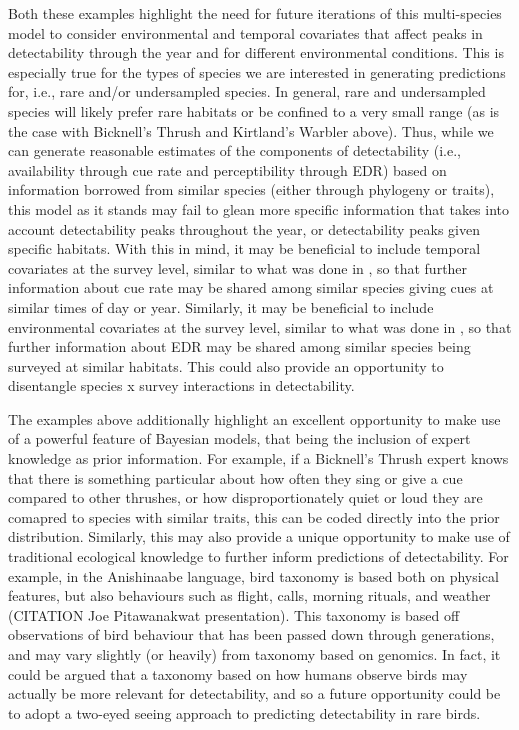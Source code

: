 \documentclass[12pt]{article}
\begin{document}
Both these examples highlight the need for future iterations of this multi-species model to consider environmental and temporal covariates that affect peaks in detectability through the year and for different environmental conditions.
This is especially true for the types of species we are interested in generating predictions for, i.e., rare and/or undersampled species.
In general, rare and undersampled species will likely prefer rare habitats or be confined to a very small range (as is the case with Bicknell's Thrush and Kirtland's Warbler above).
Thus, while we can generate reasonable estimates of the components of detectability (i.e., availability through cue rate and perceptibility through EDR) based on information borrowed from similar species (either through phylogeny or traits), this model as it stands may fail to glean more specific information that takes into account detectability peaks throughout the year, or detectability peaks given specific habitats.
With this in mind, it may be beneficial to include temporal covariates at the survey level, similar to what was done in \citet{solymos_calibrating_2013, solymos_evaluating_2018, edwards_point_2023}, so that further information about cue rate may be shared among similar species giving cues at similar times of day or year.
Similarly, it may be beneficial to include environmental covariates at the survey level, similar to what was done in \citet{solymos_calibrating_2013, edwards_point_2023}, so that further information about EDR may be shared among similar species being surveyed at similar habitats.
This could also provide an opportunity to disentangle species x survey interactions in detectability.

\par The examples above additionally highlight an excellent opportunity to make use of a powerful feature of Bayesian models, that being the inclusion of expert knowledge as prior information.
For example, if a Bicknell's Thrush expert knows that there is something particular about how often they sing or give a cue compared to other thrushes, or how disproportionately quiet or loud they are comapred to species with similar traits, this can be coded directly into the prior distribution.
Similarly, this may also provide a unique opportunity to make use of traditional ecological knowledge to further inform predictions of detectability.
For example, in the Anishinaabe language, bird taxonomy is based both on physical features, but also behaviours such as flight, calls, morning rituals, and weather (CITATION Joe Pitawanakwat presentation).
This taxonomy is based off observations of bird behaviour that has been passed down through generations, and may vary slightly (or heavily) from taxonomy based on genomics.
In fact, it could be argued that a taxonomy based on how humans observe birds may actually be more relevant for detectability, and so a future opportunity could be to adopt a two-eyed seeing approach \cite{reid_twoeyed_2021} to predicting detectability in rare birds.
\end{document}
